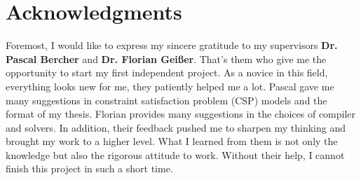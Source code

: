 \chapter*{Acknowledgments}
Foremost, I would like to express my sincere gratitude to my supervisors \textbf{Dr. Pascal Bercher} and \textbf{Dr. Florian Geißer}. That's them who give me the opportunity to start my first independent project. As a novice in this field, everything looks new for me, they patiently helped me a lot. Pascal gave me many suggestions in constraint satisfaction problem (CSP) models and the format of my thesis. Florian provides many suggestions in the choices of compiler and solvers. In addition, their feedback pushed me to sharpen my thinking and brought my work to a higher level. What I learned from them is not only the knowledge but also the rigorous attitude to work. Without their help, I cannot finish this project in such a short time.